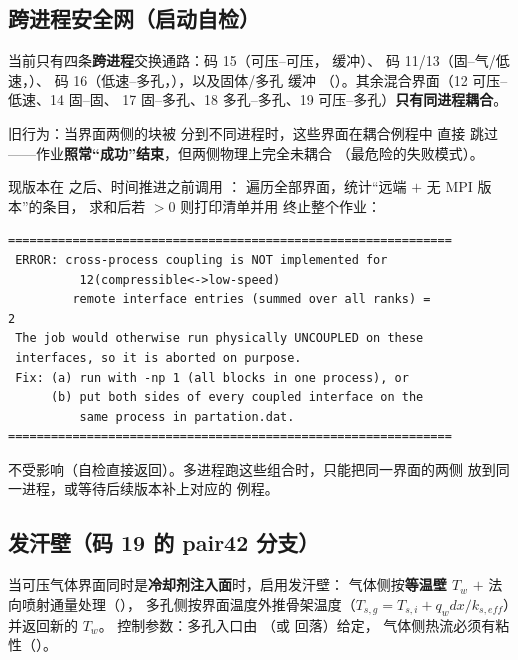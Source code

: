 \subsection{跨进程安全网（启动自检）}
当前只有四条\textbf{跨进程}交换通路：码 15（可压--可压， 缓冲）、
码 11/13（固--气/低速，）、
码 16（低速--多孔，），以及固体/多孔  缓冲
（）。其余混合界面（12 可压--低速、14 固--固、
17 固--多孔、18 多孔--多孔、19 可压--多孔）\textbf{只有同进程耦合}。

旧行为：当界面两侧的块被  分到不同进程时，这些界面在耦合例程中
直接  跳过——作业\textbf{照常“成功”结束}，但两侧物理上完全未耦合
（最危险的失败模式）。

现版本在  之后、时间推进之前调用 ：
遍历全部界面，统计“远端 $+$ 无 MPI 版本”的条目， 求和后若
$>0$ 则打印清单并用  终止整个作业：
\begin{lstlisting}
==============================================================
 ERROR: cross-process coupling is NOT implemented for
          12(compressible<->low-speed)
         remote interface entries (summed over all ranks) =           2
 The job would otherwise run physically UNCOUPLED on these
 interfaces, so it is aborted on purpose.
 Fix: (a) run with -np 1 (all blocks in one process), or
      (b) put both sides of every coupled interface on the
          same process in partation.dat.
==============================================================
\end{lstlisting}
 不受影响（自检直接返回）。多进程跑这些组合时，只能把同一界面的两侧
放到同一进程，或等待后续版本补上对应的  例程。

\subsection{发汗壁（码 19 的 pair42 分支）}
当可压气体界面同时是\textbf{冷却剂注入面}时，启用发汗壁：
气体侧按\textbf{等温壁 $T_w$} $+$ 法向喷射通量处理（），
多孔侧按界面温度外推骨架温度（$T_{s,g}=T_{s,i}+q_w dx/k_{s,eff}$）并返回新的 $T_w$。
控制参数：多孔入口由 （或  回落）给定，
气体侧热流必须有粘性（）。

